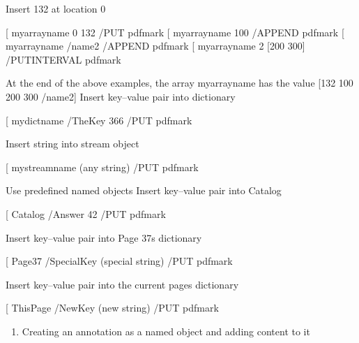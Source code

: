 \documentclass[letterpaper,12pt,english,openany,oneside]{sphinxmanual}
\begin{document}
\begin{sphinxVerbatim}[commandchars=\\\{\}]
\PYGZpc{} Insert 132 at location 0

[   \PYGZob{}myarrayname\PYGZcb{} 0 132 /PUT pdfmark
[   \PYGZob{}myarrayname\PYGZcb{} 100 /APPEND pdfmark
[   \PYGZob{}myarrayname\PYGZcb{} /name2 /APPEND pdfmark
[   \PYGZob{}myarrayname\PYGZcb{} 2 [200 300] /PUTINTERVAL pdfmark

\PYGZpc{} At the end of the above examples, the array \PYGZob{}myarrayname\PYGZcb{}
\PYGZpc{} has the value [132 100 200 300 /name2]
\PYGZpc{} Insert key–value pair into dictionary

[   \PYGZob{}mydictname\PYGZcb{} \PYGZlt{}\PYGZlt{} /TheKey 366 \PYGZgt{}\PYGZgt{} /PUT pdfmark

\PYGZpc{} Insert string into stream object

[   \PYGZob{}mystreamname\PYGZcb{} (any string) /PUT pdfmark

\PYGZpc{} Use predefined named objects
\PYGZpc{} Insert key–value pair into Catalog

[   \PYGZob{}Catalog\PYGZcb{} \PYGZlt{}\PYGZlt{} /Answer 42 \PYGZgt{}\PYGZgt{} /PUT pdfmark

\PYGZpc{} Insert key–value pair into Page 37\PYGZsq{}s dictionary

[   \PYGZob{}Page37\PYGZcb{} \PYGZlt{}\PYGZlt{} /SpecialKey (special string) \PYGZgt{}\PYGZgt{} /PUT pdfmark

\PYGZpc{} Insert key–value pair into the current page\PYGZsq{}s dictionary

[   \PYGZob{}ThisPage\PYGZcb{} \PYGZlt{}\PYGZlt{} /NewKey (new string) \PYGZgt{}\PYGZgt{} /PUT pdfmark
\end{sphinxVerbatim}
\begin{enumerate}
%
\item {} 
Creating an annotation as a named object and adding content to it

\end{enumerate}
\end{document}
